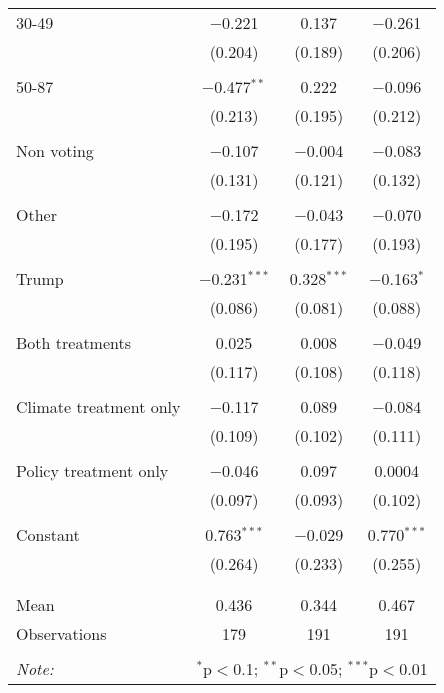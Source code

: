 \begin{tabular}{@{\extracolsep{5pt}}lccc}
 30-49 & $-$0.221 & 0.137 & $-$0.261 \\ 
  & (0.204) & (0.189) & (0.206) \\ 
  & & & \\ 
 50-87 & $-$0.477$^{**}$ & 0.222 & $-$0.096 \\ 
  & (0.213) & (0.195) & (0.212) \\ 
  & & & \\ 
 Non voting & $-$0.107 & $-$0.004 & $-$0.083 \\ 
  & (0.131) & (0.121) & (0.132) \\ 
  & & & \\ 
 Other & $-$0.172 & $-$0.043 & $-$0.070 \\ 
  & (0.195) & (0.177) & (0.193) \\ 
  & & & \\ 
 Trump & $-$0.231$^{***}$ & 0.328$^{***}$ & $-$0.163$^{*}$ \\ 
  & (0.086) & (0.081) & (0.088) \\ 
  & & & \\ 
 Both treatments & 0.025 & 0.008 & $-$0.049 \\ 
  & (0.117) & (0.108) & (0.118) \\ 
  & & & \\ 
 Climate treatment only & $-$0.117 & 0.089 & $-$0.084 \\ 
  & (0.109) & (0.102) & (0.111) \\ 
  & & & \\ 
 Policy treatment only & $-$0.046 & 0.097 & 0.0004 \\ 
  & (0.097) & (0.093) & (0.102) \\ 
  & & & \\ 
 Constant & 0.763$^{***}$ & $-$0.029 & 0.770$^{***}$ \\ 
  & (0.264) & (0.233) & (0.255) \\ 
  & & & \\ 
\hline \\[-1.8ex] 
Mean & 0.436 & 0.344 & 0.467 \\ 
Observations & 179 & 191 & 191 \\ 
\hline 
\hline \\[-1.8ex] 
\textit{Note:}  & \multicolumn{3}{r}{$^{*}$p$<$0.1; $^{**}$p$<$0.05; $^{***}$p$<$0.01} \\ 
\end{tabular} 
